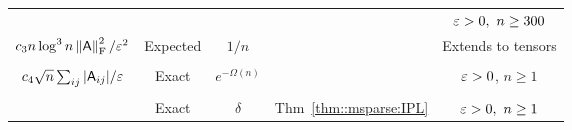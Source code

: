 \begin{center}
\begin{table}[ht]
\begin{tabular}{ || c | c | c | c | c ||}
	\hline
	& & & & $\eps>0,\ n\geq 300$ \\
	$c_3 n \log^3 n \left\|{\mathsf{A} }\right\|_{\textrm{F}}^2/\varepsilon^2$   & {\footnotesize Expected} & $1/n$ &   \cite{drineas:tensor_sparsification}  & {\footnotesize Extends to tensors}\\
 	\hline
    	\multirow{1}{*}{} & & & & \\
	$c_4 \sqrt{n}\sum_{ij}|{\mathsf{A} }_{ij}| / \varepsilon $   & {\footnotesize Exact} & $e^{-\Omega(n)}$ &   \cite{matrix:sparsification:arora}  & $\varepsilon >0$, $n\geq 1$\\
	\hline
	\multirow{2}{*}{} & & & & \\
	$14n \ln\left(2n/\delta\right)\frobnorm{\matA}^2/ \eps^{2}$ & {\footnotesize Exact} & $\delta$ &  Thm~\ref{thm::msparse:IPL}  & $\eps>0,\ n\geq 1$\\
	\hline
\end{tabular}


\end{table}
\end{center}
